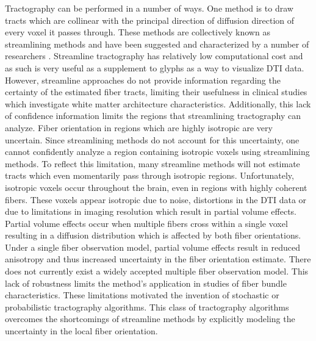 Tractography can be performed in a number of ways. One method is to draw tracts which are collinear with the principal direction of diffusion direction of every voxel it passes through.  These methods are collectively known as streamlining methods and have been suggested and characterized by a number of researchers \cite{behrensMRM03}.  Streamline tractography has relatively low computational cost and as such is very useful as a supplement to glyphs as a way to visualize DTI data.  However, streamline approaches do not provide information regarding the certainty of the estimated fiber tracts, limiting their usefulness in clinical studies which investigate white matter architecture characteristics.  Additionally, this lack of confidence information limits the regions that streamlining tractography can analyze.  Fiber orientation in regions which are highly isotropic are very uncertain.  Since streamlining methods do not account for this uncertainty, one cannot confidently analyze a region containing isotropic voxels using streamlining methods.  To reflect this limitation, many streamline methods will not estimate tracts which even momentarily pass through isotropic regions.  Unfortunately, isotropic voxels occur throughout the brain, even in regions with highly coherent fibers.  These voxels appear isotropic due to noise, distortions in the DTI data or due to limitations in imaging resolution which result in partial volume effects.  Partial volume effects occur when multiple fibers cross within a single voxel resulting in a diffusion distribution which is affected by both fiber orientations.  Under a single fiber observation model, partial volume effects result in reduced anisotropy and thus increased uncertainty in the fiber orientation estimate.  There does not currently exist a widely accepted multiple fiber observation model.  This lack of robustness limits the method's application in studies of fiber bundle characteristics.  These limitations motivated the invention of stochastic or probabilistic tractography algorithms.  This class of tractography algorithms overcomes the shortcomings of streamline methods by explicitly modeling the uncertainty in the local fiber orientation.


